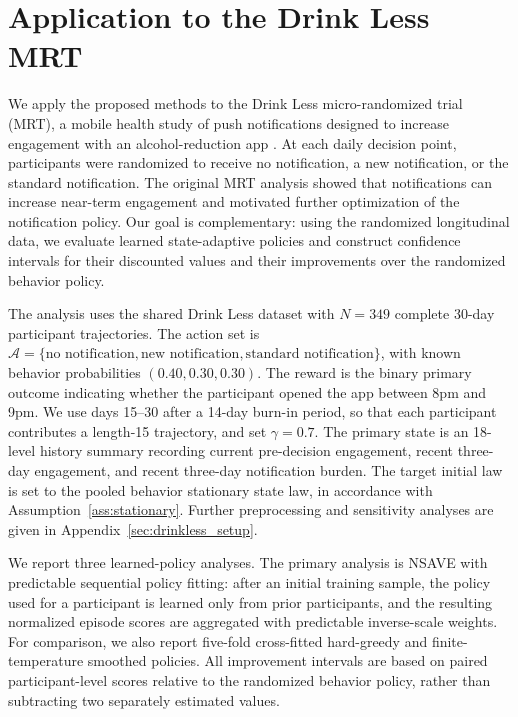 \documentclass[12pt]{article}
\theoremstyle{remark}\newtheorem{remark}[theorem]{Remark}\theoremstyle{plain}
\begin{document}
\section{Application to the Drink Less MRT}
\label{sec:realdata}

We apply the proposed methods to the Drink Less micro-randomized trial (MRT), a mobile health study of push notifications designed to increase engagement with an alcohol-reduction app \citep{bell2023notifications}.
At each daily decision point, participants were randomized to receive no notification, a new notification, or the standard notification.
The original MRT analysis showed that notifications can increase near-term engagement and motivated further optimization of the notification policy.
Our goal is complementary: using the randomized longitudinal data, we evaluate learned state-adaptive policies and construct confidence intervals for their discounted values and their improvements over the randomized behavior policy.

The analysis uses the shared Drink Less dataset with $N=349$ complete 30-day participant trajectories.
The action set is
$\mathcal A=\{\text{no notification},\text{new notification},\text{standard notification}\}$, with known behavior probabilities $(0.40,0.30,0.30)$.
The reward is the binary primary outcome indicating whether the participant opened the app between 8pm and 9pm.
We use days 15--30 after a 14-day burn-in period, so that each participant contributes a length-15 trajectory, and set $\gamma=0.7$.
The primary state is an 18-level history summary recording current pre-decision engagement, recent three-day engagement, and recent three-day notification burden.
The target initial law is set to the pooled behavior stationary state law, in accordance with Assumption~\ref{ass:stationary}.
Further preprocessing and sensitivity analyses are given in Appendix~\ref{sec:drinkless_setup}.

We report three learned-policy analyses.
The primary analysis is NSAVE with predictable sequential policy fitting: after an initial training sample, the policy used for a participant is learned only from prior participants, and the resulting normalized episode scores are aggregated with predictable inverse-scale weights.
For comparison, we also report five-fold cross-fitted hard-greedy and finite-temperature smoothed policies.
All improvement intervals are based on paired participant-level scores relative to the randomized behavior policy, rather than subtracting two separately estimated values.
\end{document}
